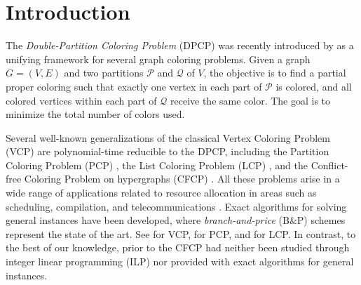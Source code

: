 \documentclass[preprint, 11pt, authoryear]{elsarticle}
\newcommand{\PP}{{\mathcal P}}
\newcommand{\QQ}{{\mathcal Q}}
\newcommand{\quitar}[1]{{\color{red} \sout{#1}}}
\begin{document}


\section{Introduction}
\label{sec.introduction}

The \emph{Double-Partition Coloring Problem} (DPCP) was recently introduced by \cite{LucciEtAl2025} as a unifying framework for several graph coloring problems.
Given a graph $G=(V,E)$ and two partitions $\PP$ and $\QQ$ of $V$, the objective is to %
find a partial proper coloring such that exactly one vertex in each part of $\PP$ is colored, and all colored vertices within each part of $\QQ$ receive the same color. 
The goal is to minimize the total number of colors used.

Several well-known generalizations of the classical Vertex Coloring Problem (VCP) %
are polynomial-time reducible to the DPCP, including the Partition Coloring Problem (PCP) \citep{li2000partition}, the List Coloring Problem (LCP) \citep{Lucci2024}, and the Conflict-free Coloring Problem on hypergraphs (CFCP) \citep{Even2003}. %
All these problems %
arise in a wide range of applications related to resource allocation in areas such as scheduling, compilation, and telecommunications \citep{JensenToft2011}.
Exact algorithms for solving general instances have been developed, where \emph{branch-and-price} (B\&P) schemes represent the state of the art. See \citet{Trick1996,MalagutiEtAl2011} for VCP,  \citet{Furini2018} for PCP, and \citet{Lucci2024} for LCP.
In contrast, to the best of our knowledge, prior to \citet{LucciEtAl2025} the CFCP had neither been studied through integer linear programming (ILP) nor provided with exact algorithms for general instances.
\end{document}
